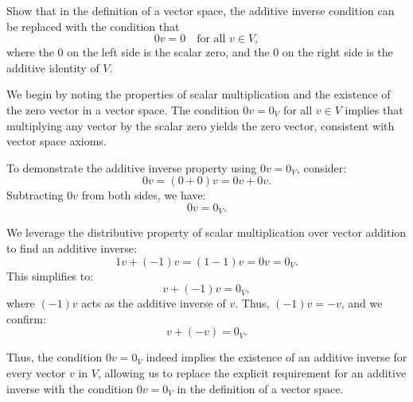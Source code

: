 \begin{exercise}
Show that in the definition of a vector space, the additive inverse condition can be replaced with the condition that
\[
0 v = 0 \quad \text{for all } v \in V,
\]
where the 0 on the left side is the scalar zero, and the 0 on the right side is the additive identity of $V$.
\end{exercise}

\begin{solution}
We begin by noting the properties of scalar multiplication and the existence of the zero vector in a vector space. The condition $0v = 0_V$ for all $v \in V$ implies that multiplying any vector by the scalar zero yields the zero vector, consistent with vector space axioms.

To demonstrate the additive inverse property using $0v = 0_V$, consider:
\[
0v = (0+0)v = 0v + 0v.
\]
Subtracting $0v$ from both sides, we have:
\[
0v = 0_V.
\]

We leverage the distributive property of scalar multiplication over vector addition to find an additive inverse:
\[
1v + (-1)v = (1-1)v = 0v = 0_V.
\]
This simplifies to:
\[
v + (-1)v = 0_V,
\]
where $(-1)v$ acts as the additive inverse of $v$. Thus, $(-1)v = -v$, and we confirm:
\[
v + (-v) = 0_V.
\]

Thus, the condition $0v = 0_V$ indeed implies the existence of an additive inverse for every vector $v$ in $V$, allowing us to replace the explicit requirement for an additive inverse with the condition $0v = 0_V$ in the definition of a vector space.
\end{solution}


